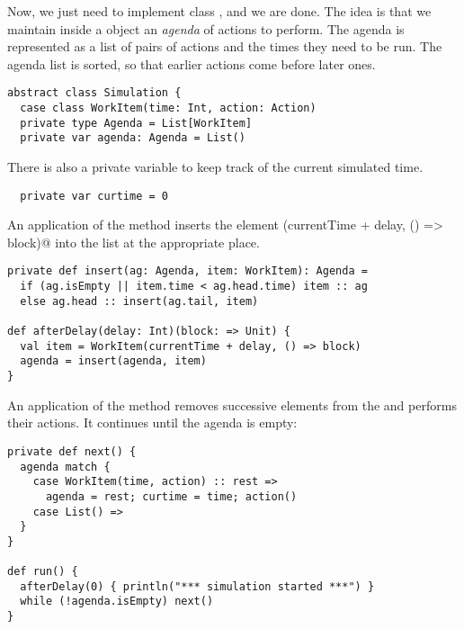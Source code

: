 Now, we just need to implement class , and we are
done.  The idea is that we maintain inside a  object
an \emph{agenda} of actions to perform.  The agenda is represented as
a list of pairs of actions and the times they need to be run.  The
agenda list is sorted, so that earlier actions come before later ones.
\begin{lstlisting} 
abstract class Simulation {
  case class WorkItem(time: Int, action: Action)
  private type Agenda = List[WorkItem]
  private var agenda: Agenda = List()
\end{lstlisting}
There is also a private variable  to keep track of the
current simulated time.
\begin{lstlisting}
  private var curtime = 0
\end{lstlisting}
An application of the method  
inserts the element \lstinline@WorkItem(currentTime + delay, () => block)@
into the  list at the appropriate place.
\begin{lstlisting}
private def insert(ag: Agenda, item: WorkItem): Agenda =
  if (ag.isEmpty || item.time < ag.head.time) item :: ag
  else ag.head :: insert(ag.tail, item)

def afterDelay(delay: Int)(block: => Unit) {
  val item = WorkItem(currentTime + delay, () => block)
  agenda = insert(agenda, item)
}
\end{lstlisting}
An application of the  method removes successive elements
from the  and performs their actions.
It continues until the agenda is empty:
\begin{lstlisting}
private def next() {
  agenda match {
    case WorkItem(time, action) :: rest =>
      agenda = rest; curtime = time; action()
    case List() =>
  }
}

def run() {
  afterDelay(0) { println("*** simulation started ***") }
  while (!agenda.isEmpty) next()
}
\end{lstlisting}


